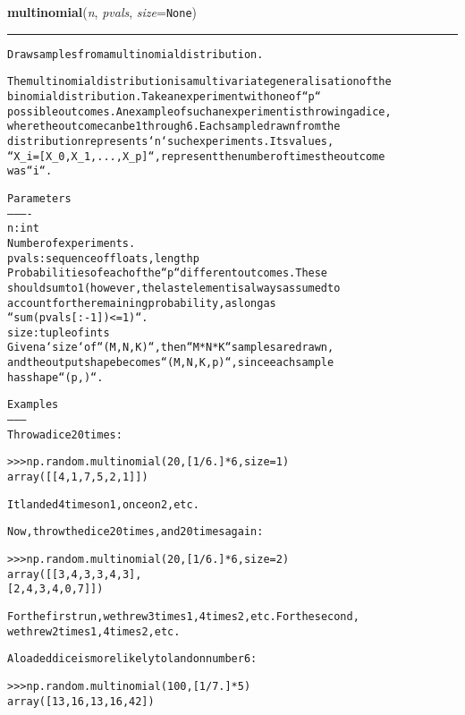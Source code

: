 \hspace{.8\funcindent}\begin{boxedminipage}{\funcwidth}

    \raggedright \textbf{multinomial}(\textit{n}, \textit{pvals}, \textit{size}={\tt None})

    \vspace{-1.5ex}

    \rule{\textwidth}{0.5\fboxrule}
\setlength{\parskip}{2ex}
\begin{alltt}
Draw samples from a multinomial distribution.

The multinomial distribution is a multivariate generalisation of the
binomial distribution.  Take an experiment with one of ``p``
possible outcomes.  An example of such an experiment is throwing a dice,
where the outcome can be 1 through 6.  Each sample drawn from the
distribution represents `n` such experiments.  Its values,
``X\_i = [X\_0, X\_1, ..., X\_p]``, represent the number of times the outcome
was ``i``.

Parameters
----------
n : int
    Number of experiments.
pvals : sequence of floats, length p
    Probabilities of each of the ``p`` different outcomes.  These
    should sum to 1 (however, the last element is always assumed to
    account for the remaining probability, as long as
    ``sum(pvals[:-1]) {\textless}= 1)``.
size : tuple of ints
    Given a `size` of ``(M, N, K)``, then ``M*N*K`` samples are drawn,
    and the output shape becomes ``(M, N, K, p)``, since each sample
    has shape ``(p,)``.

Examples
--------
Throw a dice 20 times:

{\textgreater}{\textgreater}{\textgreater} np.random.multinomial(20, [1/6.]*6, size=1)
array([[4, 1, 7, 5, 2, 1]])

It landed 4 times on 1, once on 2, etc.

Now, throw the dice 20 times, and 20 times again:

{\textgreater}{\textgreater}{\textgreater} np.random.multinomial(20, [1/6.]*6, size=2)
array([[3, 4, 3, 3, 4, 3],
       [2, 4, 3, 4, 0, 7]])

For the first run, we threw 3 times 1, 4 times 2, etc.  For the second,
we threw 2 times 1, 4 times 2, etc.

A loaded dice is more likely to land on number 6:

{\textgreater}{\textgreater}{\textgreater} np.random.multinomial(100, [1/7.]*5)
array([13, 16, 13, 16, 42])
\end{alltt}

\setlength{\parskip}{1ex}
    \end{boxedminipage}

